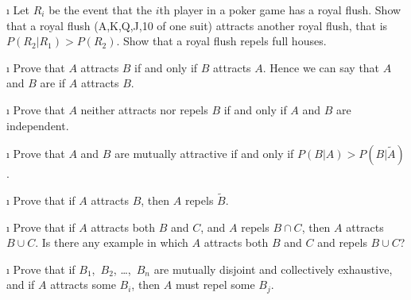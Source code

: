 \begin{LJSItem}
\i\label{exer 4.1.39} Let $R_i$ be the event that the $i$th player in a poker game has a
royal flush.  Show that a royal flush (A,K,Q,J,10 of one suit) attracts another royal flush, 
that is $P(R_2|R_1) > P(R_2)$.  Show that a royal flush repels full houses.

\i\label{exer 4.1.40} Prove that $A$ attracts $B$ if and only if $B$ attracts $A$.  Hence we
can say that $A$ and $B$ are  if $A$ attracts $B$.

\i\label{exer 4.1.41} Prove that $A$ neither attracts nor repels $B$ if and only if $A$ and
$B$ are independent.

\i\label{exer 4.1.42} Prove that $A$ and $B$ are mutually attractive if and only if $P(B|A) >
P(B|\tilde A)$.

\i\label{exer 4.1.43} Prove that if $A$ attracts $B$, then $A$ repels $\tilde B$.

\i\label{exer 4.1.44} Prove that if $A$ attracts both $B$ and $C$, and $A$ repels $B \cap C$,
then $A$ attracts $B \cup C$.  Is there any example in which $A$ attracts both
$B$ and $C$ and repels $B \cup C$?

\i\label{exer 4.1.45} Prove that if $B_1$,~$B_2$, \dots,~$B_n$ are mutually disjoint and
collectively exhaustive, and if $A$ attracts some $B_i$, then $A$ must repel
some $B_j$.


\end{LJSItem}
